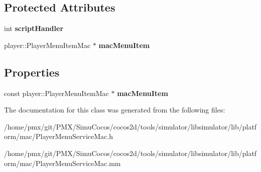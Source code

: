 \subsection*{Protected Attributes}
\begin{DoxyCompactItemize}
\item 
\mbox{\label{interfaceNNMenuItem_a2ca0b040e192cd57cec9628d9a01146c}} 
int {\bfseries script\+Handler}
\item 
\mbox{\label{interfaceNNMenuItem_a3583ef67f5bd30bd0e6e8171e9edbe6f}} 
player\+::\+Player\+Menu\+Item\+Mac $\ast$ {\bfseries mac\+Menu\+Item}
\end{DoxyCompactItemize}
\subsection*{Properties}
\begin{DoxyCompactItemize}
\item 
\mbox{\label{interfaceNNMenuItem_aa29038a786724b4c0443f844fc6e88a6}} 
const player\+::\+Player\+Menu\+Item\+Mac $\ast$ {\bfseries mac\+Menu\+Item}
\end{DoxyCompactItemize}


The documentation for this class was generated from the following files\+:\begin{DoxyCompactItemize}
\item 
/home/pmx/git/\+P\+M\+X/\+Simu\+Cocos/cocos2d/tools/simulator/libsimulator/lib/platform/mac/Player\+Menu\+Service\+Mac.\+h\item 
/home/pmx/git/\+P\+M\+X/\+Simu\+Cocos/cocos2d/tools/simulator/libsimulator/lib/platform/mac/Player\+Menu\+Service\+Mac.\+mm\end{DoxyCompactItemize}
